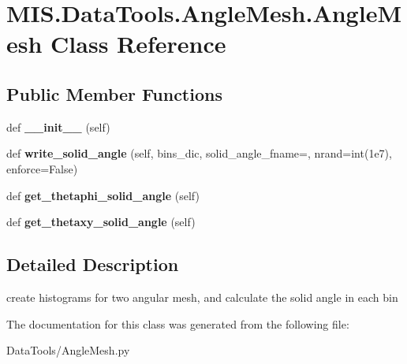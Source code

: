 \hypertarget{classMIS_1_1DataTools_1_1AngleMesh_1_1AngleMesh}{}\section{M\+I\+S.\+Data\+Tools.\+Angle\+Mesh.\+Angle\+Mesh Class Reference}
\label{classMIS_1_1DataTools_1_1AngleMesh_1_1AngleMesh}
\subsection*{Public Member Functions}
\begin{DoxyCompactItemize}
\item 
\mbox{\label{classMIS_1_1DataTools_1_1AngleMesh_1_1AngleMesh_aca9dd8c5d808a0330372ec18cf883167}} 
def {\bfseries \+\_\+\+\_\+init\+\_\+\+\_\+} (self)
\item 
\mbox{\label{classMIS_1_1DataTools_1_1AngleMesh_1_1AngleMesh_a4a0002b662a1b31fe60a69ebbad36493}} 
def {\bfseries write\+\_\+solid\+\_\+angle} (self, bins\+\_\+dic, solid\+\_\+angle\+\_\+fname=\textquotesingle{}\textquotesingle{}, nrand=int(1e7), enforce=\+False)
\item 
\mbox{\label{classMIS_1_1DataTools_1_1AngleMesh_1_1AngleMesh_ad17021aae157c47fb58bb7060936366f}} 
def {\bfseries get\+\_\+thetaphi\+\_\+solid\+\_\+angle} (self)
\item 
\mbox{\label{classMIS_1_1DataTools_1_1AngleMesh_1_1AngleMesh_a967146bcd8f3a6657861d9662f8c7db1}} 
def {\bfseries get\+\_\+thetaxy\+\_\+solid\+\_\+angle} (self)
\end{DoxyCompactItemize}


\subsection{Detailed Description}
\begin{DoxyVerb}create histograms for two angular mesh, and calculate the solid angle in each bin
\end{DoxyVerb}
 

The documentation for this class was generated from the following file\+:\begin{DoxyCompactItemize}
\item 
Data\+Tools/Angle\+Mesh.\+py\end{DoxyCompactItemize}

